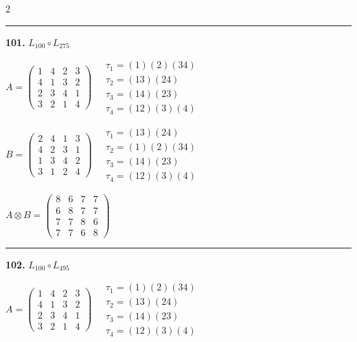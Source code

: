 \begin{multicols}{2}
\vspace{0.3em}
\hrule
\vspace{0.3em}

\noindent\textbf{101.} $L_{100} \circ L_{275}$

$A = \begin{pmatrix} 1 & 4 & 2 & 3 \\ 4 & 1 & 3 & 2 \\ 2 & 3 & 4 & 1 \\ 3 & 2 & 1 & 4 \end{pmatrix} \quad \begin{matrix} \tau_{1}=(1)(2)(3 4) \\ \tau_{2}=(1 3)(2 4) \\ \tau_{3}=(1 4)(2 3) \\ \tau_{4}=(1 2)(3)(4) \end{matrix}$

$B = \begin{pmatrix} 2 & 4 & 1 & 3 \\ 4 & 2 & 3 & 1 \\ 1 & 3 & 4 & 2 \\ 3 & 1 & 2 & 4 \end{pmatrix} \quad \begin{matrix} \tau_{1}=(1 3)(2 4) \\ \tau_{2}=(1)(2)(3 4) \\ \tau_{3}=(1 4)(2 3) \\ \tau_{4}=(1 2)(3)(4) \end{matrix}$

$A \otimes B = \begin{pmatrix} 8 & 6 & 7 & 7 \\ 6 & 8 & 7 & 7 \\ 7 & 7 & 8 & 6 \\ 7 & 7 & 6 & 8 \end{pmatrix}$

\vspace{0.3em}
\hrule
\vspace{0.3em}

\noindent\textbf{102.} $L_{100} \circ L_{495}$

$A = \begin{pmatrix} 1 & 4 & 2 & 3 \\ 4 & 1 & 3 & 2 \\ 2 & 3 & 4 & 1 \\ 3 & 2 & 1 & 4 \end{pmatrix} \quad \begin{matrix} \tau_{1}=(1)(2)(3 4) \\ \tau_{2}=(1 3)(2 4) \\ \tau_{3}=(1 4)(2 3) \\ \tau_{4}=(1 2)(3)(4) \end{matrix}$


\end{multicols}
